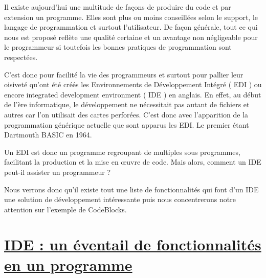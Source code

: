 \documentclass[a4paper, 12pt]{article}
\begin{document}
\begin{doublespace}

	Il existe aujourd'hui une multitude de façons de produire du code et par extension un programme. Elles sont plus ou moins conseillées selon le support, le langage de programmation et surtout l'utilisateur. De façon générale, tout ce qui nous est proposé reflète une qualité certaine et un avantage non négligeable pour le programmeur si toutefois les bonnes pratiques de programmation sont respectées.

	C'est donc pour facilité la vie des programmeurs et surtout pour pallier leur oisiveté qu'ont été créés les Environnements de Développement Intégré ( EDI ) ou encore integrated development environment ( IDE ) en anglais. En effet, au début de l'ère informatique, le développement ne nécessitait pas autant de fichiers et autres car l'on utilisait des cartes perforées. C'est donc avec l'apparition de la programmation générique actuelle que sont apparus les EDI. Le premier étant Dartmouth BASIC en 1964.

	Un EDI est donc un programme regroupant de multiples sous programmes, facilitant la production et la mise en œuvre de code. Mais alors, comment un IDE peut-il assister un programmeur ?

	Nous verrons donc qu'il existe tout une liste de fonctionnalités qui font d'un IDE une solution de développement intéressante puis nous concentrerons notre attention sur l'exemple de CodeBlocks.
\end{doublespace}

\newpage \section{\underline{IDE : un éventail de fonctionnalités en un programme}}
\end{document}
